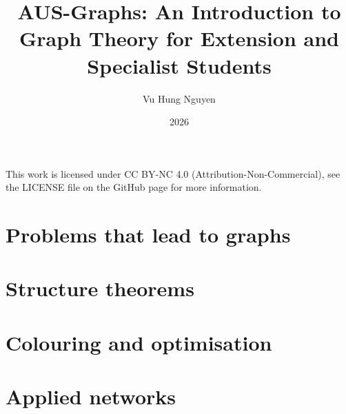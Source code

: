 \documentclass[11pt]{book}
\title{AUS-Graphs: An Introduction to Graph Theory for Extension and Specialist Students}
\author{Vu Hung Nguyen}
\date{2026}
\begin{document}


\setcounter{page}{1}

\thispagestyle{empty}

\begingroup\small\noindent
This work is licensed under CC BY-NC 4.0 (Attribution-Non-Commercial), see the LICENSE file on the GitHub page for more information.
\par\endgroup

\clearpage


\clearpage
\tableofcontents
\clearpage



\mainmatter
\part{Problems that lead to graphs}




\part{Structure theorems}



\part{Colouring and optimisation}




\appendix
\part{Applied networks}





\backmatter





\end{document}
